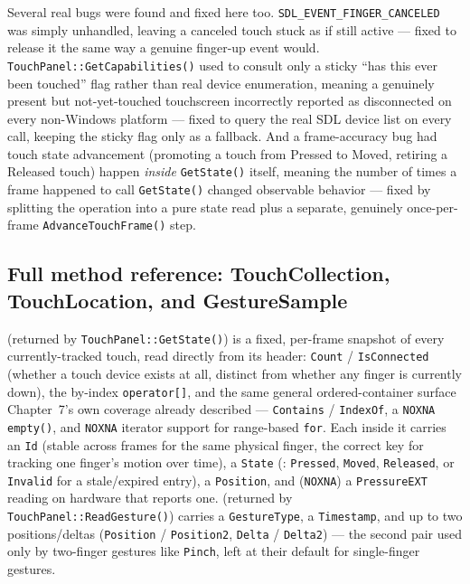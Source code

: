 Several real bugs were found and fixed here too. \texttt{SDL\_EVENT\_FINGER\_CANCELED} was
simply unhandled, leaving a canceled touch stuck as if still active --- fixed to release it
the same way a genuine finger-up event would. \texttt{TouchPanel::GetCapabilities()} used to
consult only a sticky ``has this ever been touched'' flag rather than real device
enumeration, meaning a genuinely present but not-yet-touched touchscreen incorrectly reported
as disconnected on every non-Windows platform --- fixed to query the real SDL device list on
every call, keeping the sticky flag only as a fallback. And a frame-accuracy bug had touch
state advancement (promoting a touch from Pressed to Moved, retiring a Released touch) happen
\emph{inside} \texttt{GetState()} itself, meaning the number of times a frame happened to
call \texttt{GetState()} changed observable behavior --- fixed by splitting the operation
into a pure state read plus a separate, genuinely once-per-frame
\texttt{AdvanceTouchFrame()} step.

\subsection{Full method reference: TouchCollection, TouchLocation, and GestureSample}

 (returned by \texttt{TouchPanel::GetState()}) is a fixed, per-frame
snapshot of every currently-tracked touch, read directly from its header:
\texttt{Count} / \texttt{IsConnected} (whether a touch device exists at all, distinct from
whether any finger is currently down), the by-index \texttt{operator[]}, and the same general
ordered-container surface Chapter~7's own  coverage already
described --- \texttt{Contains} / \texttt{IndexOf}, a \texttt{NOXNA} \texttt{empty()}, and
\texttt{NOXNA} iterator support for range-based \texttt{for}. Each  inside it carries
an \texttt{Id} (stable across frames for the same physical finger, the correct key for
tracking one finger's motion over time), a \texttt{State} (:
\texttt{Pressed}, \texttt{Moved}, \texttt{Released}, or \texttt{Invalid} for a stale/expired
entry), a \texttt{Position}, and (\texttt{NOXNA}) a \texttt{PressureEXT} reading on hardware
that reports one.  (returned by \texttt{TouchPanel::ReadGesture()})
carries a \texttt{GestureType}, a \texttt{Timestamp}, and up to two positions/deltas
(\texttt{Position} / \texttt{Position2}, \texttt{Delta} / \texttt{Delta2}) --- the second pair used
only by two-finger gestures like \texttt{Pinch}, left at their default for single-finger
gestures.

